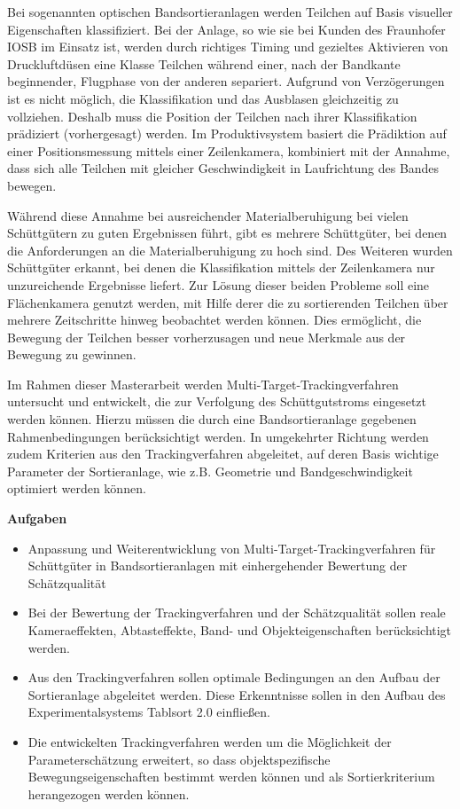 \documentclass [a4paper, 10pt]{scrartcl}
\begin{document}
\Anfang
Bei sogenannten optischen Bandsortieranlagen werden Teilchen auf Basis
visueller Eigenschaften klassifiziert. Bei der Anlage, so wie sie bei
Kunden des Fraunhofer IOSB im Einsatz ist, werden durch richtiges Timing
und gezieltes Aktivieren von Druckluftdüsen eine Klasse Teilchen während
einer, nach der Bandkante beginnender, Flugphase von der anderen separiert.
Aufgrund von Verzögerungen ist es nicht möglich, die Klassifikation und das
Ausblasen gleichzeitig zu vollziehen. Deshalb muss die Position der
Teilchen nach ihrer Klassifikation prädiziert (vorhergesagt) werden. Im
Produktivsystem basiert die Prädiktion auf einer Positionsmessung mittels
einer Zeilenkamera, kombiniert mit der Annahme, dass sich alle Teilchen mit
gleicher Geschwindigkeit in Laufrichtung des Bandes bewegen.

Während diese Annahme bei ausreichender Materialberuhigung bei vielen
Schüttgütern zu guten Ergebnissen führt, gibt es mehrere Schüttgüter, bei
denen die Anforderungen an die Materialberuhigung zu hoch sind. Des
Weiteren wurden Schüttgüter erkannt, bei denen die Klassifikation mittels
der Zeilenkamera nur unzureichende Ergebnisse liefert. 
Zur Lösung dieser beiden Probleme soll eine Flächenkamera genutzt werden, mit Hilfe derer die zu sortierenden Teilchen über
mehrere Zeitschritte hinweg beobachtet werden können. Dies ermöglicht, die
Bewegung der Teilchen besser vorherzusagen und neue Merkmale aus der
Bewegung zu gewinnen.

Im Rahmen dieser Masterarbeit werden Multi-Target-Trackingverfahren untersucht und entwickelt, die zur Verfolgung 
des Schüttgutstroms eingesetzt werden können. Hierzu müssen die durch eine Bandsortieranlage gegebenen Rahmenbedingungen berücksichtigt werden. 
In umgekehrter Richtung werden zudem Kriterien aus den Trackingverfahren abgeleitet, auf deren Basis wichtige Parameter der Sortieranlage, wie z.B. Geometrie und Bandgeschwindigkeit optimiert werden können.  


\textbf{Aufgaben}
\begin{itemize}
  \item Anpassung und Weiterentwicklung von Multi-Target-Trackingverfahren für Schüttgüter in Bandsortieranlagen mit einhergehender Bewertung der Schätzqualität
  \item Bei der Bewertung der Trackingverfahren und der Schätzqualität sollen reale Kameraeffekten, Abtasteffekte, Band- und Objekteigenschaften berücksichtigt werden.
  \item Aus den Trackingverfahren sollen optimale Bedingungen an den Aufbau der Sortieranlage abgeleitet werden. Diese Erkenntnisse sollen in den Aufbau des Experimentalsystems Tablsort 2.0 einfließen.
  \item Die entwickelten Trackingverfahren werden um die Möglichkeit der Parameterschätzung erweitert, so dass objektspezifische Bewegungseigenschaften bestimmt werden können und als Sortierkriterium herangezogen werden können.
\end{itemize}
\Ende
\end{document}

